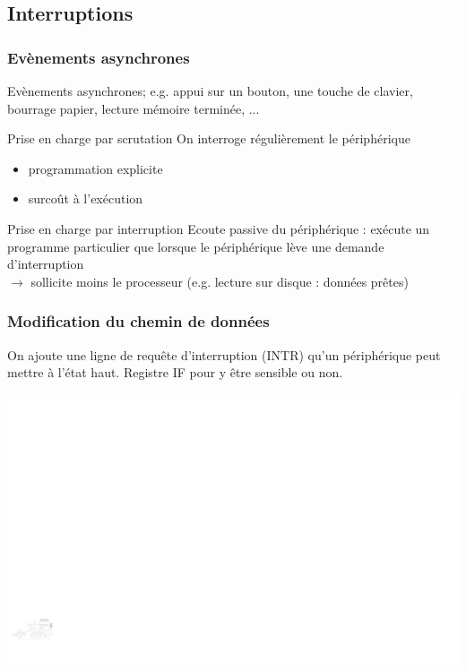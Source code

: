 \documentclass{beamer}
\begin{document}
\subsection{Interruptions}

\begin{frame}
\frametitle{Evènements asynchrones}

Evènements asynchrones; e.g. appui sur un bouton, une touche de clavier, bourrage papier, lecture mémoire terminée, ...
\begin{block}{Prise en charge par scrutation}
On interroge régulièrement le périphérique 
\begin{itemize}
\item programmation explicite
\item surcoût à l'exécution 
\end{itemize}
\end{block}
\begin{block}{Prise en charge par interruption}
Ecoute passive du périphérique : exécute un programme particulier que lorsque le périphérique lève une demande d'interruption\\
$\rightarrow$ sollicite moins le processeur (e.g. lecture sur disque : données prêtes)
\end{block}
\end{frame}

\begin{frame}
\frametitle{Modification du chemin de données}

On ajoute une ligne de requête d'interruption (INTR) qu'un périphérique peut mettre à l'état haut. Registre IF pour y être sensible ou non.

\includegraphics[width=\linewidth]{Figs/premier_chemin_seq_irq.pdf}

\end{frame}
\end{document}
